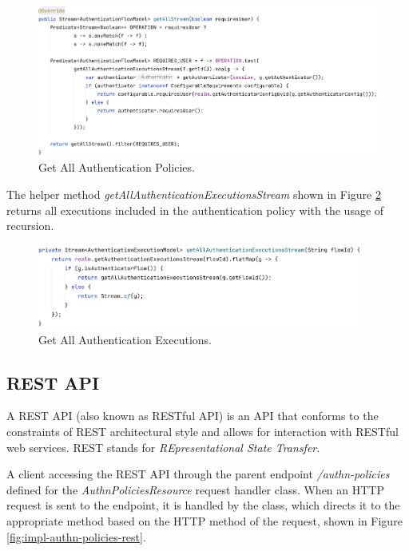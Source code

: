 \begin{figure}[htbp]
  \centering
  \includegraphics[width=1\textwidth]{img/sections/6-implementation/authnPolicyGetAllStream.png}
  \caption{Get All Authentication Policies.}
  \label{fig:impl-authn-policies-get-all}
\end{figure}

The helper method \textit{getAllAuthenticationExecutionsStream} shown in Figure \ref{fig:impl-authn-policies-get-all-execs} returns all executions included in the authentication policy with the usage of recursion.

\begin{figure}[htbp]
  \centering
  \includegraphics[width=0.95\textwidth]{img/sections/6-implementation/authnPolicyGetAllExecutions.png}
  \caption{Get All Authentication Executions.}
  \label{fig:impl-authn-policies-get-all-execs}
\end{figure}

\newpage
\subsection{REST API} \label{impl-authn-policies-rest}
A REST API (also known as RESTful API) is an API that conforms to the constraints of REST architectural style and allows for interaction with RESTful web services.
REST stands for \textit{REpresentational State Transfer}.\cite{impl-rest} 

A client accessing the REST API through the parent endpoint \textit{/authn-policies} defined for the \textit{AuthnPoliciesResource} request handler class.
When an HTTP request is sent to the endpoint, it is handled by the class, which directs it to the appropriate method based on the HTTP method of the request, shown in Figure \ref{fig:impl-authn-policies-rest}.


